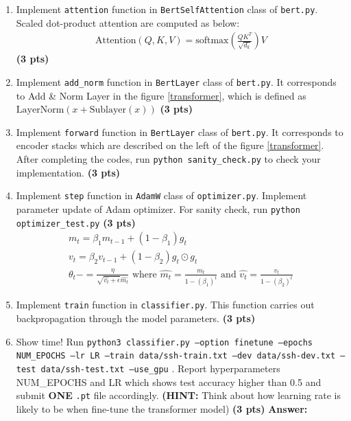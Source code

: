 \documentclass{assignment format}
\newenvironment{answer}{
    {\bf Answer:} \begingroup\color{red}
}{\endgroup}%
\begin{document}
\begin{enumerate}[label=(\alph*)]

    \item Implement \texttt{attention} function in \texttt{BertSelfAttention} class of \texttt{bert.py}. Scaled dot-product attention are computed as below: 
        \begin{align}
\text{Attention}(Q,K,V) = \text{softmax}(\frac{QK^T}{\sqrt{d_k}})V
\end{align} \textbf{(3 pts)}
    \item Implement \texttt{add\_norm} function in \texttt{BertLayer} class of \texttt{bert.py}. It corresponds to Add \& Norm Layer in the figure \ref{transformer}, which is defined as $\text{LayerNorm}(x+\text{Sublayer}(x))$ \textbf{(3 pts)}
    \item  Implement \texttt{forward} function in \texttt{BertLayer} class of \texttt{bert.py}. It corresponds to encoder stacks which are described on the left of the figure \ref{transformer}. After completing the codes, run \texttt{python sanity\_check.py} to check your implementation. \textbf{(3 pts)}
   \item  Implement \texttt{step} function in \texttt{AdamW} class of \texttt{optimizer.py}. Implement parameter update of Adam optimizer. For sanity check, run \texttt{python optimizer\_test.py} \textbf{(3 pts)}
           \begin{align}
m_t=\beta_1 m_{t-1}+(1-\beta_1)g_t \\
v_t=\beta_2 v_{t-1}+(1-\beta_2)g_t\odot g_t  \\
\theta_t-=\frac{\eta}{\sqrt{\hat{v_t}+\epsilon}\hat{m_t}} \text{ where } \hat{m_t}=\frac{m_t}{1-(\beta_1)^t} \text{ and } \hat{v_t}=\frac{v_t}{1-(\beta_2)^t} 
\end{align} 
  \item  Implement \texttt{train} function in \texttt{classifier.py}. This function carries out backpropagation through the model parameters. \textbf{(3 pts)}
  
   \item Show time! Run \texttt{python3 classifier.py --option finetune --epochs NUM\_EPOCHS --lr LR --train data/ssh-train.txt --dev data/ssh-dev.txt --test data/ssh-test.txt --use\_gpu} . Report hyperparameters NUM\_EPOCHS and LR which shows test accuracy higher than 0.5 and submit \textbf{ONE} \texttt{.pt} file accordingly. \newline \textbf{(HINT: }Think about how learning rate is likely to be when fine-tune the transformer model) \textbf{(3 pts)} \begin{answer}
   \end{answer}
\end{enumerate}
\end{document}
